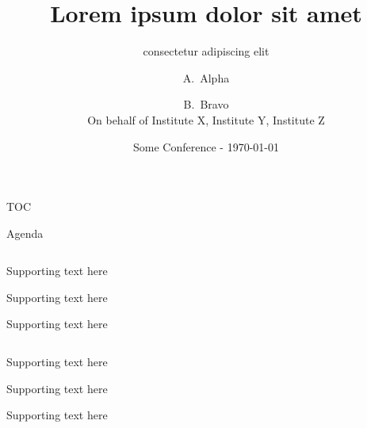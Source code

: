 \documentclass[aspectratio=169, t, 9pt]{beamer} %
\title[Beamer] %
{Lorem ipsum dolor sit amet}
\subtitle{consectetur adipiscing elit}
\author[Arthur, Doe] %
{A.~Alpha\inst{1} \and B.~Bravo\inst{2} \\ On behalf of Institute X, Institute Y, Institute Z}
\institute[SLAC] %
{
  \inst{1}%
  Faculty of Foo\\
  Bar University
  \and
  \inst{2}%
  Faculty of Baz\\
  Quz University
}
\date{Some Conference - \today}%
\begin{document}
\begin{frame}
\titlepage
\end{frame}


\begin{frame}[SloganTitleUnderline]{TOC}
    \LARGE \tableofcontents%
\end{frame}


\begin{frame}[FloatingTitle]{Agenda}
\begin{groupcolumns}
    \hspace{0.25\textwidth}
    \begin{column}{0.35\textwidth}
        
        Supporting text here

        \vspace{20pt}
        
        Supporting text here

        \vspace{20pt}
        
        Supporting text here
    \end{column}
    \begin{column}{0.35\textwidth}
        
        Supporting text here

        \vspace{20pt}
        
        Supporting text here

        \vspace{20pt}
        
        Supporting text here
    \end{column}
\end{groupcolumns}
\end{frame}
\end{document}
